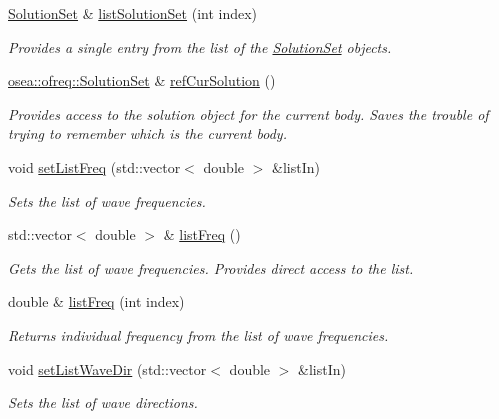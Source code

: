 \begin{DoxyCompactItemize}
\hyperlink{classosea_1_1ofreq_1_1_solution_set}{Solution\-Set} \& \hyperlink{classosea_1_1ofreq_1_1_outputs_body_ae3e9d0060457376bb42661db79392d4b}{list\-Solution\-Set} (int index)
\begin{DoxyCompactList}\small\item\em Provides a single entry from the list of the \hyperlink{classosea_1_1ofreq_1_1_solution_set}{Solution\-Set} objects. \end{DoxyCompactList}\item 
\hyperlink{classosea_1_1ofreq_1_1_solution_set}{osea\-::ofreq\-::\-Solution\-Set} \& \hyperlink{classosea_1_1ofreq_1_1_outputs_body_abc2caacb89c3574f31286f5a0e967671}{ref\-Cur\-Solution} ()
\begin{DoxyCompactList}\small\item\em Provides access to the solution object for the current body. Saves the trouble of trying to remember which is the current body. \end{DoxyCompactList}\item 
void \hyperlink{classosea_1_1ofreq_1_1_outputs_body_a66e80853f6e8cad402a67c45502d0f03}{set\-List\-Freq} (std\-::vector$<$ double $>$ \&list\-In)
\begin{DoxyCompactList}\small\item\em Sets the list of wave frequencies. \end{DoxyCompactList}\item 
std\-::vector$<$ double $>$ \& \hyperlink{classosea_1_1ofreq_1_1_outputs_body_a6b28621ef475c1d917270e2259e1629f}{list\-Freq} ()
\begin{DoxyCompactList}\small\item\em Gets the list of wave frequencies. Provides direct access to the list. \end{DoxyCompactList}\item 
double \& \hyperlink{classosea_1_1ofreq_1_1_outputs_body_aea5ac6ef687c5dc979817b967bc9dfe2}{list\-Freq} (int index)
\begin{DoxyCompactList}\small\item\em Returns individual frequency from the list of wave frequencies. \end{DoxyCompactList}\item 
void \hyperlink{classosea_1_1ofreq_1_1_outputs_body_aec7bf6b2bb30646a4f45045810265d84}{set\-List\-Wave\-Dir} (std\-::vector$<$ double $>$ \&list\-In)
\begin{DoxyCompactList}\small\item\em Sets the list of wave directions. \end{DoxyCompactList}\item 

\end{DoxyCompactItemize}
